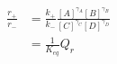 \begin{eqnarray}
\frac{r_+}{r_-} & = \frac{k_+}{k_-}\frac{[A]^{\gamma_A}[B]^{\gamma_B}}{[C]^{\gamma_C}[D]^{\gamma_D}} \\
&  =  \frac{1}{K_{eq}}Q_r \\
\end{eqnarray}